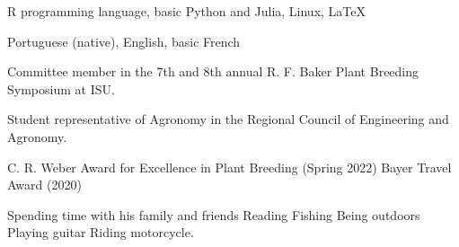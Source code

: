 \documentclass[]{deedy-resume-openfont}
\begin{document}
\begin{minipage}[t]{1\textwidth}
\sectionsep

R programming language, basic Python and Julia, Linux, \LaTeX

\sectionsep

Portuguese (native), English, basic French

\sectionsep

\begin{tightemize}
	\item {} Committee member in the 7th and 8th annual R. F. Baker Plant Breeding Symposium at ISU.
	\item {} Student representative of Agronomy in the Regional Council of Engineering and Agronomy.
\end{tightemize}

\sectionsep

C. R. Weber Award for Excellence in Plant Breeding (Spring 2022) \textbullet{} Bayer Travel Award (2020) \\

\sectionsep

Spending time with his family and friends \textbullet{} Reading \textbullet{} Fishing \textbullet{} Being outdoors \textbullet{} Playing guitar \textbullet{} Riding motorcycle. \\

\sectionsep
{}

\sectionsep
\sectionsep



\end{minipage}
\end{document}
